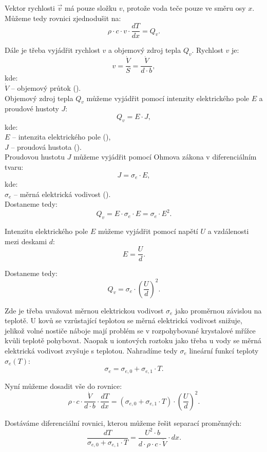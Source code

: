 \documentclass{article}
\begin{document}
Vektor rychlosti $\vec{v}$ má pouze složku $v$, protože voda teče pouze ve směru osy $x$. Můžeme tedy rovnici zjednodušit na:
$$
    \rho \cdot c \cdot v \cdot \frac{dT}{dx} = Q_v.
$$

Dále je třeba vyjádřit rychlost $v$ a objemový zdroj tepla $Q_v$. Rychlost $v$ je:
$$
    v = \frac{\dot{V}}{S} = \frac{\dot{V}}{d \cdot b},
$$
kde:\\
$\dot{V}$ -- objemový průtok (\ueqMcuSinv).\\

Objemový zdroj tepla $Q_v$ můžeme vyjádřit pomocí intenzity elektrického pole $E$ a proudové hustoty $J$:
$$
    Q_v = E \cdot J,
$$
kde:\\
$E$ -- intenzita elektrického pole (\ueqVandMinv),\\
$J$ -- proudová hustota (\ueqAandMinvsq).\\

Proudovou hustotu $J$ můžeme vyjádřit pomocí Ohmova zákona v diferenciálním tvaru:
$$
    J = \sigma_e \cdot E,
$$
kde:\\
$\sigma_e$ -- měrná elektrická vodivost (\ueqOHMandMinv).\\

Dostaneme tedy:
$$
    Q_v = E \cdot \sigma_e \cdot E = \sigma_e \cdot E^2.
$$

Intenzitu elektrického pole $E$ můžeme vyjádřit pomocí napětí $U$ a vzdálenosti mezi deskami $d$:
$$
    E = \frac{U}{d}.
$$

Dostaneme tedy:
$$
    Q_v = \sigma_e \cdot \left( \frac{U}{d} \right)^2.
$$

Zde je třeba uvažovat měrnou elektrickou vodivost $\sigma_e$ jako proměrnou závislou na teplotě. U kovů se vzrůstající teplotou se měrná elektrická vodivost snižuje, jelikož volné nostiče náboje mají problém se v rozpohybované krystalové mřížce kvůli teplotě pohybovat. Naopak u iontových roztoku jako třeba u vody se měrná elektrická vodivost zvyšuje s teplotou. Nahradíme tedy $\sigma_e$ lineární funkcí teploty $\sigma_e(T)$:
$$
    \sigma_e = \sigma_{e,0} + \sigma_{e,1} \cdot T.
$$

Nyní můžeme dosadit vše do rovnice:
$$
    \rho \cdot c \cdot \frac{\dot{V}}{d \cdot b} \cdot \frac{dT}{dx} = \left( \sigma_{e,0} + \sigma_{e,1} \cdot T \right) \cdot \left( \frac{U}{d} \right)^2.
$$

Dostáváme diferenciální rovnici, kterou můžeme řešit separací proměnných:
$$
    \frac{dT}{\sigma_{e,0} + \sigma_{e,1} \cdot T} = \frac{U^2 \cdot b}{d \cdot \rho \cdot c \cdot \dot{V}} \cdot dx.
$$
\end{document}
